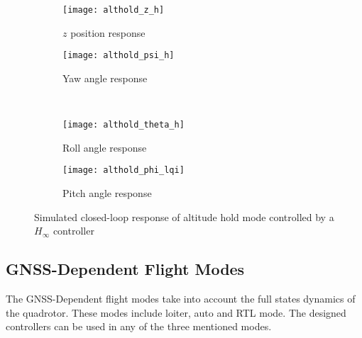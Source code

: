 \begin{figure}[H]
\begin{subfigure}{.5\linewidth}
\centering
\texttt{[image: althold\_z\_h]}
\caption{$z$ position response}
\label{fig:althold_z_h}
\end{subfigure}%
\begin{subfigure}{.5\linewidth}
\centering
\texttt{[image: althold\_psi\_h]}
\caption{Yaw angle response}
\label{fig:althold_psi_h}
\end{subfigure}\\[1ex]
\begin{subfigure}{0.5\linewidth}
\centering
\texttt{[image: althold\_theta\_h]}
\caption{Roll angle response}
\label{fig:althold_theta_h}
\end{subfigure}
\begin{subfigure}{0.5\linewidth}
\centering
\texttt{[image: althold\_phi\_lqi]}
\caption{Pitch angle response}
\label{fig:althold_phi_h}
\end{subfigure}
\caption{Simulated closed-loop response of altitude hold mode controlled by a $H_\infty$ controller}
\label{fig:althold_h}
\end{figure}

\subsection{GNSS-Dependent Flight Modes}
The GNSS-Dependent flight modes take into account the full states dynamics of the quadrotor. These modes include loiter, auto and RTL mode. The designed controllers can be used in any of the three mentioned modes.
